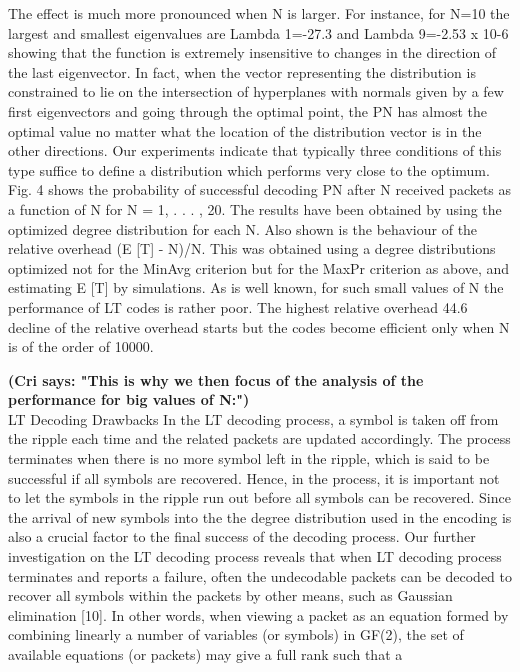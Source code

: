 \documentclass[12pt,a4paper,titlepage,twocolumn]{article}
\newcommand{\cri}[1]{\textcolor{MyColor2}{\textbf{(Cri says: #1)}}}
\begin{document}
\begin{itemize}
The effect is much more pronounced when N is larger. For
instance, for N=10 the largest and smallest eigenvalues are
Lambda 1=-27.3 and Lambda 9=-2.53 x 10-6 showing that the function
is extremely insensitive to changes in the direction of the last
eigenvector. In fact, when the vector representing the distribution
is constrained to lie on the intersection of hyperplanes
with normals given by a few first eigenvectors and going
through the optimal point, the PN has almost the optimal value
no matter what the location of the distribution vector is in the
other directions. Our experiments indicate that typically three
conditions of this type suffice to define a distribution which
performs very close to the optimum.
Fig. 4 shows the probability of successful decoding PN after
N received packets as a function of N for N = 1, . . . , 20.
The results have been obtained by using the optimized degree
distribution for each N. Also shown is the behaviour of the
relative overhead (E [T] - N)/N. This was obtained using
a degree distributions optimized not for the MinAvg criterion
but for the MaxPr criterion as above, and estimating E [T] by
simulations. As is well known, for such small values of N the
performance of LT codes is rather poor. The highest relative
overhead 44.6 %
decline of the relative overhead starts but the codes become efficient only when N is of the order of 10000.
\end{itemize}
\cri{"This is why we then focus of the analysis of the performance for big values of N:"}\\
LT Decoding Drawbacks
In the LT decoding process, a symbol is taken off from
the ripple each time and the related packets are updated
accordingly. The process terminates when there is no more
symbol left in the ripple, which is said to be successful if all
symbols are recovered. Hence, in the process, it is important
not to let the symbols in the ripple run out before all symbols
can be recovered. Since the arrival of new symbols into the the degree distribution used in the encoding is also a crucial
factor to the final success of the decoding process.
Our further investigation on the LT decoding process reveals
that when LT decoding process terminates and reports a
failure, often the undecodable packets can be decoded to
recover all symbols within the packets by other means, such
as Gaussian elimination [10]. In other words, when viewing a
packet as an equation formed by combining linearly a number
of variables (or symbols) in GF(2), the set of available
equations (or packets) may give a full rank such that a
\end{document}

